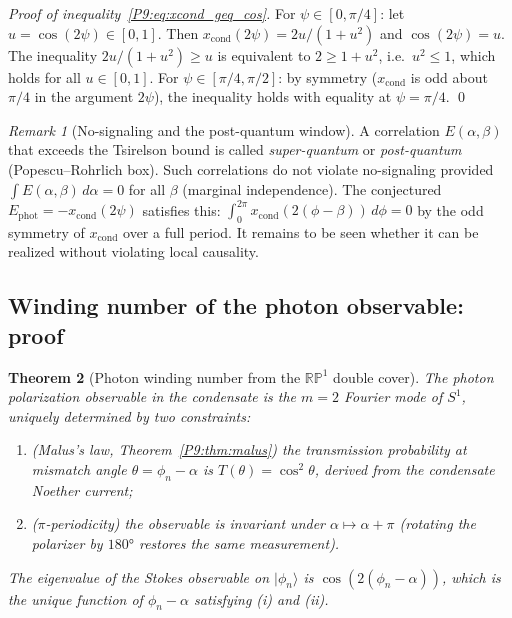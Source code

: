 \documentclass[11pt,a4paper]{article}
\newtheorem{theorem}{Theorem}[section]
\theoremstyle{definition}
\theoremstyle{remark}
\newtheorem{remark}[theorem]{Remark}
\newcommand{\xcond}{x_{\mathrm{cond}}}
\begin{document}
\begin{proof}[Proof of inequality~\eqref{P9:eq:xcond_geq_cos}]
For $\psi\in[0,\pi/4]$: let $u=\cos(2\psi)\in[0,1]$.
Then $\xcond(2\psi) = 2u/(1+u^2)$ and $\cos(2\psi)=u$.
The inequality $2u/(1+u^2)\geq u$ is equivalent to $2\geq 1+u^2$,
i.e.\ $u^2\leq 1$, which holds for all $u\in[0,1]$.
For $\psi\in[\pi/4,\pi/2]$: by symmetry ($\xcond$ is odd about $\pi/4$
in the argument $2\psi$), the inequality holds with equality at $\psi=\pi/4$.
\qed
\end{proof}
 
\begin{remark}[No-signaling and the post-quantum window]
\label{P9:rem:nosignaling}
A correlation $E(\alpha,\beta)$ that exceeds the Tsirelson bound is
called \emph{super-quantum} or \emph{post-quantum} (Popescu--Rohrlich box).
Such correlations do not violate no-signaling provided
$\int E(\alpha,\beta)\,d\alpha = 0$ for all $\beta$ (marginal independence).
The conjectured $E_\mathrm{phot} = -\xcond(2\psi)$ satisfies this:
$\int_0^{2\pi}\xcond(2(\phi-\beta))\,d\phi = 0$ by the odd symmetry of
$\xcond$ over a full period. It remains to be seen whether it can be realized without violating local causality.
\end{remark}

\subsection{Winding number of the photon observable: proof}
\label{P9:sec:m_phot}

\begin{theorem}[Photon winding number from the $\mathbb{RP}^1$ double cover]
\label{P9:thm:m_phot}
The photon polarization observable in the condensate is the $m=2$
Fourier mode of $S^1$, uniquely determined by two constraints:
\begin{enumerate}[label=(\roman*),noitemsep]
\item \emph{(Malus's law, Theorem~\ref{P9:thm:malus})} the transmission
  probability at mismatch angle $\theta=\phi_n-\alpha$ is
  $T(\theta)=\cos^2\theta$, derived from the condensate Noether current;
\item \emph{($\pi$-periodicity)} the observable is invariant under
  $\alpha\mapsto\alpha+\pi$ (rotating the polarizer by $180°$ restores the same measurement).
\end{enumerate}
The eigenvalue of the Stokes observable on $|\phi_n\rangle$ is
$\cos(2(\phi_n-\alpha))$, which is the unique function of $\phi_n-\alpha$
satisfying (i) and (ii).
\end{theorem}
\end{document}
